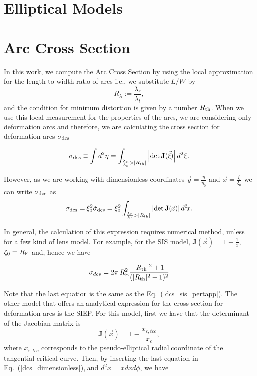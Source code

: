 \section{Elliptical Models}

\section{Arc Cross Section}
In this work, we compute the Arc Cross Section by using the local approximation
for the length-to-width ratio of arcs i.e., we substitute $L/W$ by 
\begin{equation}
R_\lambda:=\dfrac{\lambda_r}{\lambda_t},
\end{equation}
and the condition for minimum distortion is given by a number $R_{\rm th}$.  When we use this local measurement for the properties of the arcs, we are considering only deformation arcs and therefore, we are calculating the cross section for deformation arcs $\sigma_{\rm dcs}$

\begin{equation}
\sigma_{\rm dcs} \equiv \int d^2\eta =\int_{ \frac{\lambda_r}{\lambda_t} > |R_{\rm th}|} \left |{\rm det}\,\textbf{J}(\vec{\xi}) \right| d^2\xi.
\end{equation}

However, as we are working with dimensionless coordinates $ \vec{y}=\frac{\eta}{\eta_0}$ and $\vec{x}=\frac{\xi}{\xi_0}$ we can write $\sigma_{\rm dcs}$ as
\begin{equation}
\sigma_{\rm dcs} = \xi_0^2\tilde{\sigma}_{\rm dcs}= \xi_0^2 \int_{ \frac{\lambda_r}{\lambda_t} > |R_{\rm th}|} \left |{\rm det}\,\textbf{J}(\vec{x}) \right| d^2\!x. \label{dcs_dimensionless}
\end{equation}

In general, the calculation of this expression requires numerical method,
unless for a few kind of lens model.  For example, for the SIS model,
$\mathbf{J}(\vec{x})=1-\frac{1}{x}$, $\xi_0=R_{\mathrm{E}}$ and, hence we have

\begin{equation}
\sigma_{dcs}=2\pi\,R^2_{\rm E} \dfrac{|R_{\rm th}|^2+1}{(|R_{\rm th}|^2-1)^2} \label{dcs_sis}
\end{equation}

Note that the last equation is the same as the Eq.~(\ref{dcs_sis_pertapp}). The
other  model that offers an analytical expression for the cross section for
deformation arcs is the SIEP. For this model, first we have that the determinant
of the Jacobian matrix is
\begin{equation}
\mathbf{J}(\vec{x})=1-\dfrac{x_{\varepsilon,tcc}}{x_{\varepsilon}}, \label{jacob_siep}
\end{equation}
where $x_{\varepsilon,tcc}$ corresponds to the pseudo-elliptical radial
coordinate of the tangential critical curve. Then, by inserting the last
equation in Eq.~(\ref{dcs_dimensionless}), and $d^2 x=xdx d\phi$, we have

